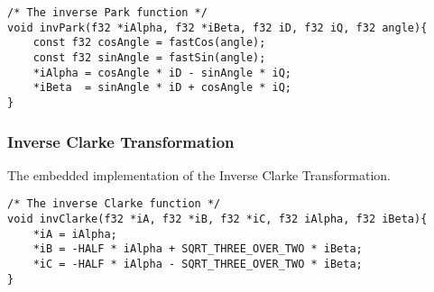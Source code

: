 \begin{lstlisting}[style=c, caption=Embedded Inverse Park Transformation., label=app:code:inverse_park]
/* The inverse Park function */
void invPark(f32 *iAlpha, f32 *iBeta, f32 iD, f32 iQ, f32 angle){
	const f32 cosAngle = fastCos(angle);
	const f32 sinAngle = fastSin(angle);
	*iAlpha = cosAngle * iD - sinAngle * iQ;
	*iBeta  = sinAngle * iD + cosAngle * iQ;
}
\end{lstlisting}



\subsubsection{Inverse Clarke Transformation}
\label{app:inverse_clarke}
The embedded implementation of the Inverse Clarke Transformation.

\begin{lstlisting}[style=c, caption=Embedded Inverse Clarke Transformation., label=app:code:inverse_clarke]
/* The inverse Clarke function */
void invClarke(f32 *iA, f32 *iB, f32 *iC, f32 iAlpha, f32 iBeta){
	*iA = iAlpha;
	*iB = -HALF * iAlpha + SQRT_THREE_OVER_TWO * iBeta;
	*iC = -HALF * iAlpha - SQRT_THREE_OVER_TWO * iBeta;
}
\end{lstlisting}